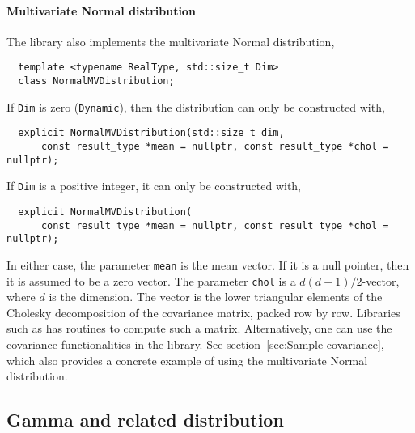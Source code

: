 \paragraph{Multivariate Normal distribution}

The library also implements the multivariate Normal distribution,
\begin{Verbatim}
  template <typename RealType, std::size_t Dim>
  class NormalMVDistribution;
\end{Verbatim}
If \verb|Dim| is zero (\verb|Dynamic|), then the distribution can only be
constructed with,
\begin{Verbatim}
  explicit NormalMVDistribution(std::size_t dim,
      const result_type *mean = nullptr, const result_type *chol = nullptr);
\end{Verbatim}
If \verb|Dim| is a positive integer, it can only be constructed with,
\begin{Verbatim}
  explicit NormalMVDistribution(
      const result_type *mean = nullptr, const result_type *chol = nullptr);
\end{Verbatim}
In either case, the parameter \verb|mean| is the mean vector. If it is a null
pointer, then it is assumed to be a zero vector. The parameter \verb|chol| is a
$d(d + 1)/2$-vector, where $d$ is the dimension. The vector is the lower
triangular elements of the Cholesky decomposition of the covariance matrix,
packed row by row. Libraries such as \lapack has routines to compute such a
matrix. Alternatively, one can use the covariance functionalities in the
library. See section~\ref{sec:Sample covariance}, which also provides a
concrete example of using the multivariate Normal distribution.

\subsection{Gamma and related distribution}
\label{sub:Gamma and related distribution}

